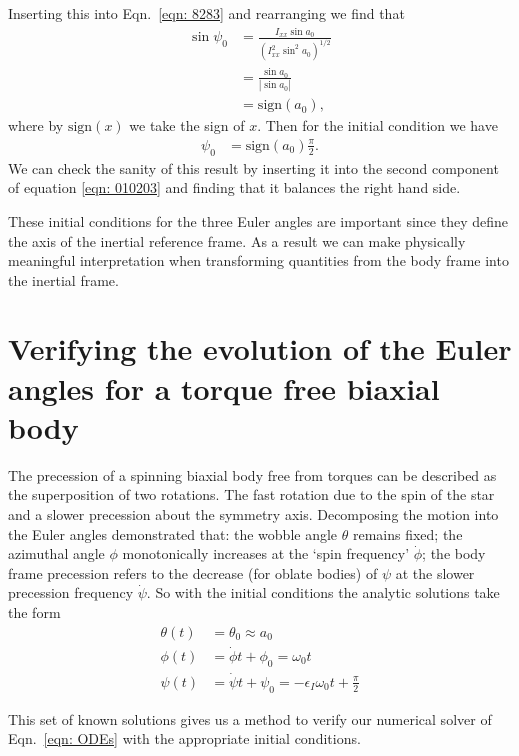 \documentclass[../full_thesis/full_thesis.tex]{subfiles}
\begin{document}
Inserting this into Eqn.~\eqref{eqn: 8283} and rearranging we find that
\begin{align}
\sin \psi_0 & = \frac{I_{xx} \sin a_{0}}{\left(I_{xx}^{2} \sin^{2} a_{0}\right)^{1/2}} \\
 & = \frac{\sin a_{0} }{|\sin a_{0}|} \\
& = \mathrm{sign}(a_{0}),
\end{align}
where by $\mathrm{sign}(x)$ we take the sign of $x$. Then for the initial condition we
have
\begin{align}
\psi_{0} & =\mathrm{sign}(a_{0}) \frac{\pi}{2}.
\label{eqn: psi  init}
\end{align}
We can check the sanity of this result by inserting it into the second component of
equation \eqref{eqn: 010203} and finding that it balances the right hand side.

These initial conditions for the three Euler angles are important since they
define the axis of the inertial reference frame. As a result we can make
physically meaningful interpretation when transforming quantities from the body
frame into the inertial frame.

\section{Verifying the evolution of the Euler angles for a torque free biaxial body}
\label{sec: biaxial body with no torque}

The precession of a spinning biaxial body free from torques can be described as
the superposition of two rotations.  The fast rotation due to the spin of the
star and a slower precession about the symmetry axis. Decomposing the motion
into the Euler angles \citet{Jones2001} demonstrated that: the wobble angle
$\theta$ remains fixed; the azimuthal angle $\phi$ monotonically increases at
the `spin frequency' $\dot{\phi}$; the body frame precession refers to the
decrease (for oblate bodies) of $\psi$ at the slower precession frequency
$\dot{\psi}$. So with the initial conditions the analytic solutions take
the form
\begin{align}
    \theta(t) & = \theta_{0} \approx a_{0} \\
    \phi(t) & = \dot{\phi}t + \phi_{0} = \omega_{0} t \\
    \psi(t) & = \dot{\psi}t + \psi_{0}= -\epsilon_{I}\omega_{0}t+\frac{\pi}{2}
    \label{eqn: euler angles torque free evolution}
\end{align}

This set of known solutions gives us a method to
verify our numerical solver of Eqn.~\eqref{eqn: ODEs} with the appropriate
initial conditions.
\end{document}
